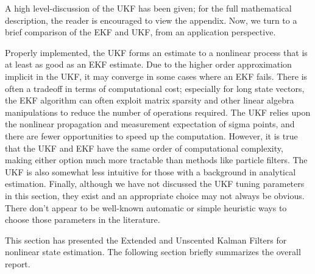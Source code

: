 A high level-discussion of the UKF has been given; for the full mathematical description, the reader is encouraged to view the appendix.
Now, we turn to a brief comparison of the EKF and UKF, from an application perspective.

Properly implemented, the UKF forms an estimate to a nonlinear process that is at least as good as an EKF estimate.
Due to the higher order approximation implicit in the UKF, it may converge in some cases where an EKF fails.
There is often a tradeoff in terms of computational cost; especially for long state vectors, the EKF algorithm can often exploit matrix sparsity and other linear algebra manipulations to reduce the number of operations required.
The UKF relies upon the nonlinear propagation and measurement expectation of sigma points, and there are fewer opportunities to speed up the computation. 
However, it is true that the UKF and EKF have the same order of computational complexity\cite{wan2000}, making either option much more tractable than methods like particle filters.
The UKF is also somewhat less intuitive for those with a background in analytical estimation.
Finally, although we have not discussed the UKF tuning parameters in this section, they exist and an appropriate choice may not always be obvious.
There don't appear to be well-known automatic or simple heuristic ways to choose those parameters in the literature.

This section has presented the Extended and Unscented Kalman Filters for nonlinear state estimation.
The following section briefly summarizes the overall report.